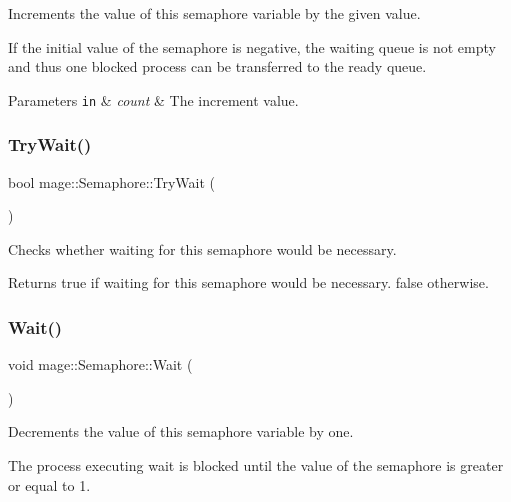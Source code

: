 Increments the value of this semaphore variable by the given value.

If the initial value of the semaphore is negative, the waiting queue is not empty and thus one blocked process can be transferred to the ready queue.


\begin{DoxyParams}[1]{Parameters}
\mbox{\tt in}  & {\em count} & The increment value. \\
\hline
\end{DoxyParams}
\hypertarget{classmage_1_1_semaphore_a46d08edac69437678d05f354f10619de}{}\label{classmage_1_1_semaphore_a46d08edac69437678d05f354f10619de} 
\subsubsection{\texorpdfstring{Try\+Wait()}{TryWait()}}
{\footnotesize\ttfamily bool mage\+::\+Semaphore\+::\+Try\+Wait (\begin{DoxyParamCaption}{ }\end{DoxyParamCaption})\hspace{0.3cm}{\ttfamily [noexcept]}}

Checks whether waiting for this semaphore would be necessary.

\begin{DoxyReturn}{Returns}
{\ttfamily true} if waiting for this semaphore would be necessary. {\ttfamily false} otherwise. 
\end{DoxyReturn}
\hypertarget{classmage_1_1_semaphore_ab0be313e63792315ee9b227dea1184be}{}\label{classmage_1_1_semaphore_ab0be313e63792315ee9b227dea1184be} 
\subsubsection{\texorpdfstring{Wait()}{Wait()}}
{\footnotesize\ttfamily void mage\+::\+Semaphore\+::\+Wait (\begin{DoxyParamCaption}{ }\end{DoxyParamCaption})\hspace{0.3cm}{\ttfamily [noexcept]}}

Decrements the value of this semaphore variable by one.

The process executing wait is blocked until the value of the semaphore is greater or equal to 1. 

